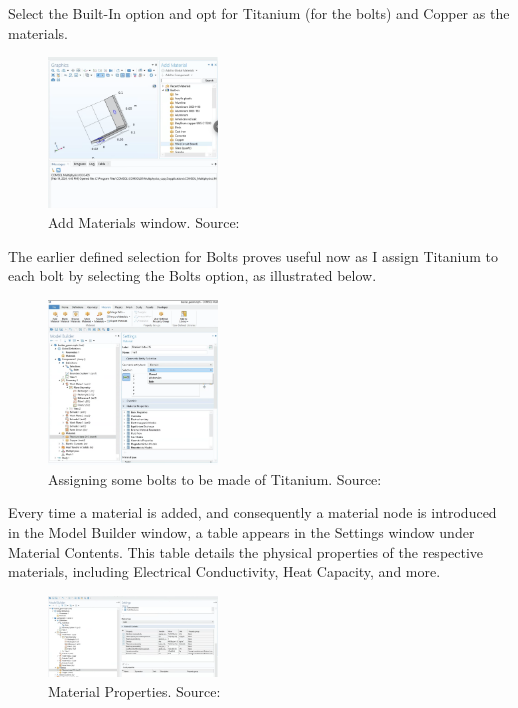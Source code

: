 Select the Built-In option and opt for Titanium (for the bolts) and Copper as the materials.

\begin{figure}[ht!]
  \centering
  \includegraphics[width=0.4\textwidth]{Chapters/Figures/Chapter 3 Figures/Add Material Window.png}
  \caption{Add Materials window. Source: \cite{multiphysics__modeling_nodate}}
  \label{fig:Add Materials window.}
\end{figure}

The earlier defined selection for Bolts proves useful now as I assign Titanium to each bolt by selecting the Bolts option, as illustrated below.

\begin{figure}[ht!]
  \centering
  \includegraphics[width=0.4\textwidth]{Chapters/Figures/Chapter 3 Figures/Bolts Selection Choice.png}
  \caption{Assigning some bolts to be made of Titanium. Source: \cite{multiphysics__modeling_nodate}}
  \label{fig:Assigning some bolts to be made of Titanium.}
\end{figure}

Every time a material is added, and consequently a material node is introduced in the Model Builder window, a table appears in the Settings window under Material Contents. This table details the physical properties of the respective materials, including Electrical Conductivity, Heat Capacity, and more.

\begin{figure}[ht!]
  \centering
  \includegraphics[width=0.4\textwidth]{Chapters/Figures/Chapter 3 Figures/Material Contents in Settings Window.png}
  \caption{Material Properties. Source: \cite{multiphysics__modeling_nodate}}
  \label{fig: Material properties.}
\end{figure}

